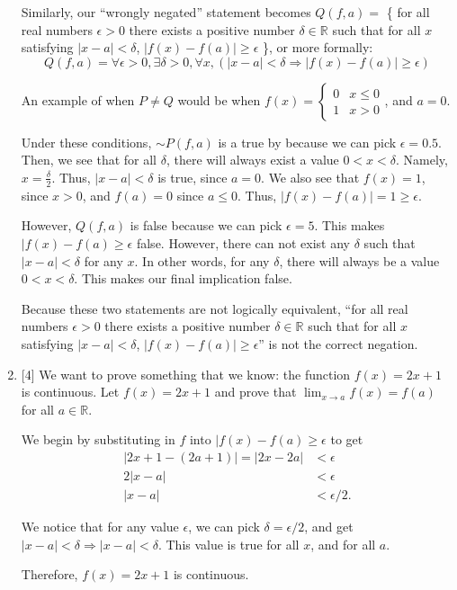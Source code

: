 \documentclass{article}
\begin{document}
\begin{enumerate}
{        Similarly, our ``wrongly negated'' statement becomes \(Q(f, a) = \) \{
            for all real numbers \(\epsilon > 0\) there exists a 
            positive number \(\delta \in \mathbb{R}\) such that for all \(x\) satisfying
            \(|x - a| < \delta\), \(|f(x) - f(a)| \ge \epsilon\)
        \}, or more formally:
        \[Q(f, a) = \forall \epsilon > 0, \exists \delta > 0, \forall x, (|x - a| < \delta \Rightarrow |f(x) - f(a)| \ge \epsilon)\]

        An example of when \(P \not= Q\) would be when
        \(
        f(x) = 
        \begin{cases}
            0 & x \le 0\\
            1 & x > 0
        \end{cases}
        \), and \(a = 0\).

        Under these conditions, \(\sim P(f, a)\) is a true by because we can pick 
        \(\epsilon = 0.5\). Then, we see that for all \(\delta\), there will always 
        exist a value \(0 < x < \delta\). Namely, \(x = \frac{\delta}{2}\). Thus, 
        \(|x - a| < \delta\) is true, since \(a = 0\). 
        We also see that \(f(x) = 1\), since \(x > 0\), and \(f(a) = 0\) since \(a \le 0\). 
        Thus, \(|f(x) - f(a)| = 1 \ge \epsilon\). 

        However, \(Q(f, a)\) is false because we can pick \(\epsilon = 5\). This 
        makes \(|f(x) - f(a) \ge \epsilon\) false. However, there can not exist 
        any \(\delta\) such that \(|x - a| < \delta\) for any \(x\). In other words,
        for any \(\delta\), there will always be a value \(0 < x < \delta\). This 
        makes our final implication false. 

        Because these two statements are not logically equivalent, 
        ``for all real numbers \(\epsilon > 0\) there exists a 
        positive number \(\delta \in \mathbb{R}\) such that for all \(x\) satisfying
        \(|x - a| < \delta\), \(|f(x) - f(a)| \ge \epsilon\)'' is not the correct 
        negation. 
    }

    \item {
        [4] We want to prove something that we know: the function \(f(x) = 2x+1\) 
        is continuous. Let \(f(x) = 2x+1\) and prove that \(\displaystyle \lim_{x \to a} f(x) = f(a)\)
        for all \(a \in \mathbb{R}\).

        We begin by substituting in \(f\) into \(|f(x) - f(a) \ge \epsilon\)
        to get 
        \begin{align*}
            |2x + 1 - (2a + 1)| = |2x - 2a| &< \epsilon\\
            2|x - a| &< \epsilon \\
            |x - a| &< \epsilon / 2.
        \end{align*}

        We notice that for any value \(\epsilon\), we can pick \(\delta = \epsilon / 2\),
        and get \(|x - a| < \delta \Rightarrow |x - a| < \delta\). This value is true for all \(x\), 
        and for all \(a\). 

        Therefore, \(f(x) = 2x + 1\) is continuous.
    }
\end{enumerate}



\end{document}

